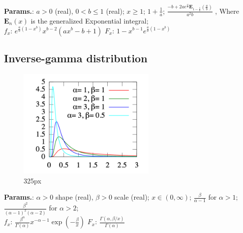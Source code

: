     {\color{darkblue} \textbf{Params.}:} {$a>0$ (real),  $0<b\leq1$ (real)}; {$x \geq 1$}; {$1+\frac{1}{a}$}; {$ \frac{-b + 2ae^{\frac{a}{b}}\mathbf{E}_{1-\frac{1}{b}}\left(\frac{a}{b}\right)}{a^2 b}$ , Where $\mathbf{E}_n(x)$ is the generalized Exponential integral};\hspace{0.5cm}\\{\color{darkblue} \textbf{$f_x$}:} {$ e^{\frac{a}{b}(1 - x^b)}x^{b-2}\left(ax^b - b + 1\right) $}{\color{darkblue} \textbf{$F_x$}:} {$ 1 - x^{b-1}e^{\frac{a}{b}(1 - x^b)} $}



    
        
\subsection{Inverse-gamma distribution}


    \begin{figure}[H]
        \centering
        \includegraphics[width=0.6\textwidth]{images/Inv gamma pdf.png}
        \caption{325px}
    \end{figure}




    {\color{darkblue} \textbf{Params.}:} {$\alpha>0$ shape (real),  $\beta>0$ scale (real)}; {$x\in(0,\infty)\!$}; {$\frac{\beta}{\alpha-1}\!$ for $\alpha > 1$}; {$\frac{\beta^2}{(\alpha-1)^2(\alpha-2)}\!$ for $\alpha > 2$};\hspace{0.5cm}\\{\color{darkblue} \textbf{$f_x$}:} {$\frac{\beta^\alpha}{\Gamma(\alpha)} x^{-\alpha - 1} \exp \left(-\frac{\beta}{x}\right)$}{\color{darkblue} \textbf{$F_x$}:} {$\frac{\Gamma(\alpha,\beta/x)}{\Gamma(\alpha)} \!$}



